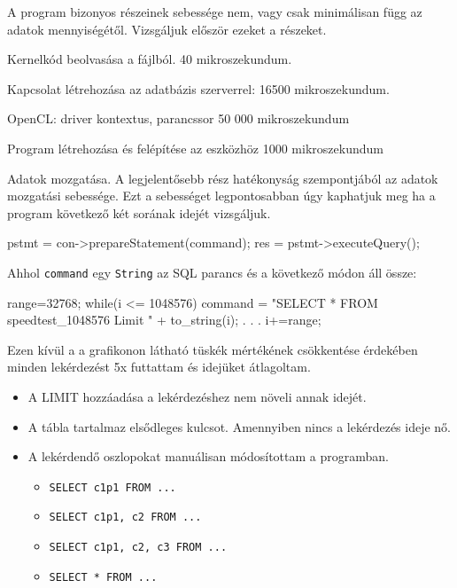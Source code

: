 

A program bizonyos részeinek sebessége nem, vagy csak minimálisan függ az adatok mennyiségétől. Vizsgáljuk először ezeket a részeket.

Kernelkód beolvasása a fájlból.
40 mikroszekundum.

Kapcsolat létrehozása az adatbázis szerverrel:
16500 mikroszekundum.

OpenCL: driver kontextus, parancssor
50 000 mikroszekundum

Program létrehozása és felépítése az eszközhöz
1000 mikroszekundum


Adatok mozgatása.
A legjelentősebb rész hatékonyság szempontjából az adatok mozgatási sebessége.
Ezt a sebességet legpontosabban úgy kaphatjuk meg ha a program következő két sorának idejét vizsgáljuk.
\begin{python}
pstmt = con->prepareStatement(command);
res = pstmt->executeQuery();
\end{python}
Ahhol \texttt{command} egy \texttt{String} az SQL parancs és a következő módon áll össze:
\begin{python}
range=32768;
    while(i <= 1048576){
    		command = "SELECT * FROM speedtest_1048576 Limit " 
    			+ to_string(i);
    		. . .
   	 	i+=range;
    }
\end{python}
Ezen kívül a a grafikonon látható tüskék mértékének csökkentése érdekében minden lekérdezést 5x futtattam és idejüket átlagoltam.
\begin{itemize}
\item A LIMIT hozzáadása a lekérdezéshez nem növeli annak idejét.
\item A tábla tartalmaz elsődleges kulcsot. Amennyiben nincs a lekérdezés ideje nő.
\item A lekérdendő oszlopokat manuálisan módosítottam a programban. 
\begin{itemize} 
\item \texttt{SELECT c1p1 FROM ...}
\item \texttt{SELECT c1p1, c2 FROM ...} 
\item \texttt{SELECT c1p1, c2, c3 FROM ...} 
\item \texttt{SELECT * FROM ...} 
\end{itemize}
\end{itemize}


